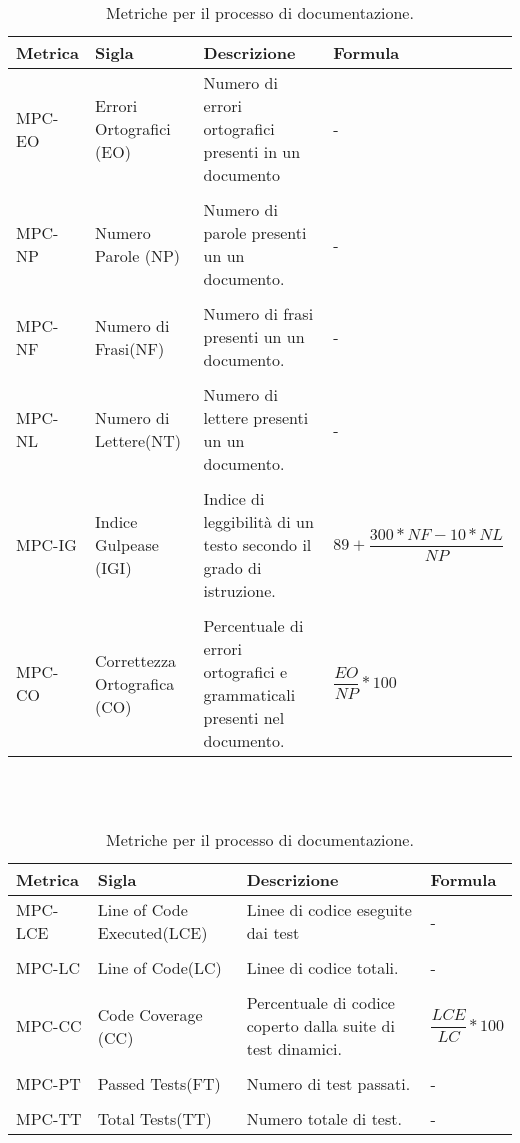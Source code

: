 \begin{table}[h]	
	\centering
	\begin{tabular}{p{2cm} p{3cm} p{6cm} p{4cm}}
		\toprule
		\textbf{Metrica}& \textbf{Sigla} & \textbf{Descrizione} & \textbf{Formula} \\
		\midrule
		MPC-EO & Errori Ortografici (EO) & Numero di errori ortografici presenti in un documento & - \\\\
		MPC-NP & Numero Parole (NP) & Numero di parole presenti un un documento. & - \\\\
		MPC-NF & Numero di Frasi(NF) & Numero di frasi presenti un un documento. & - \\\\
		MPC-NL & Numero di Lettere(NT) & Numero di lettere presenti un un documento. & - \\\\
		MPC-IG & Indice Gulpease (IGI) & Indice di leggibilità di un testo secondo il grado di istruzione. & $ 89 + \dfrac{300 * NF - 10 * NL}{NP} $ \\\\
		MPC-CO & Correttezza Ortografica (CO) & Percentuale di errori ortografici e grammaticali presenti nel documento. & $ \dfrac{EO}{NP} * 100 $ \\
		\bottomrule
	\end{tabular}
	\caption{Metriche per il processo di documentazione.}
	\label{table:Tabella delle metriche per il processo di documentazione}
\end{table}
\\\\
\begin{table}[h]	
	\centering
	\begin{tabular}{p{2cm} p{3cm} p{6cm} p{4cm}}
		\toprule
		\textbf{Metrica}& \textbf{Sigla} & \textbf{Descrizione} & \textbf{Formula} \\
		\midrule
		MPC-LCE & Line of Code Executed(LCE) & Linee di codice eseguite dai test & - \\\\
		MPC-LC & Line of Code(LC) & Linee di codice totali. & - \\\\
		MPC-CC & Code Coverage (CC) & Percentuale di codice coperto dalla suite di test dinamici. & $ \dfrac{LCE}{LC} * 100 $ \\\\
		MPC-PT & Passed Tests(FT) & Numero di test passati. & - \\\\
		MPC-TT & Total Tests(TT) & Numero totale di test. & - \\
		\bottomrule
	\end{tabular}
	\caption{Metriche per il processo di documentazione.}
	\label{table:Tabella delle metriche per il processo di documentazione}
\end{table}
